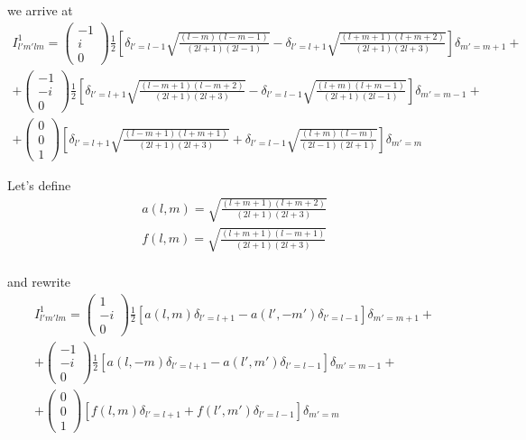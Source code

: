 \documentclass[aps,prb,floatfix,epsfig,singlecolumn,showpacs,preprintnumbers]{revtex4}
\begin{document}
we arrive at
\begin{eqnarray}
I^1_{l'm'lm}=
\left(
\begin{array}{c}
-1\\
i\\
0
\end{array}
\right)
\frac{1}{2}\left[
\delta_{l'=l-1}
\sqrt{\frac{(l-m)(l-m-1)}{(2l+1)(2l-1)}}-
\delta_{l'=l+1}
\sqrt{\frac{(l+m+1)(l+m+2)}{(2l+1)(2l+3)}}
\right]\delta_{m'=m+1}
+\\+
\left(
\begin{array}{c}
-1\\
-i\\
0
\end{array}
\right)
\frac{1}{2}\left[
\delta_{l'=l+1}
\sqrt{\frac{(l-m+1)(l-m+2)}{(2l+1)(2l+3)}}-
\delta_{l'=l-1}
\sqrt{\frac{(l+m)(l+m-1)}{(2l+1)(2l-1)}}
\right]\delta_{m'=m-1}
+\\+
\left(
\begin{array}{c}
0\\
0\\
1
\end{array}
\right)
\left[
\delta_{l'=l+1}
\sqrt{\frac{(l-m+1)(l+m+1)}{(2l+1)(2l+3)}}+
\delta_{l'=l-1}
\sqrt{\frac{(l+m)(l-m)}{(2l-1)(2l+1)}}
\right]\delta_{m'=m}
\end{eqnarray}

Let's define
\begin{eqnarray}
a(l,m)=\sqrt{\frac{(l+m+1)(l+m+2)}{(2l+1)(2l+3)}}\\
f(l,m)=\sqrt{\frac{(l+m+1)(l-m+1)}{(2l+1)(2l+3)}}\\
\end{eqnarray}

and rewrite
\begin{eqnarray}
I^1_{l'm'lm}=
\left(
\begin{array}{c}
1\\
-i\\
0
\end{array}
\right)
\frac{1}{2}\left[
a(l,m) 
\delta_{l'=l+1}-
a(l',-m') 
\delta_{l'=l-1}
\right]\delta_{m'=m+1}
+\\+
\left(
\begin{array}{c}
-1\\
-i\\
0
\end{array}
\right)
\frac{1}{2}\left[
a(l,-m)
\delta_{l'=l+1}
-
a(l',m')\delta_{l'=l-1}
\right]\delta_{m'=m-1}
+\\+
\left(
\begin{array}{c}
0\\
0\\
1
\end{array}
\right)
\left[
f(l,m)
\delta_{l'=l+1}
+
f(l',m')
\delta_{l'=l-1}
\right]\delta_{m'=m}
\end{eqnarray}
\end{document}
